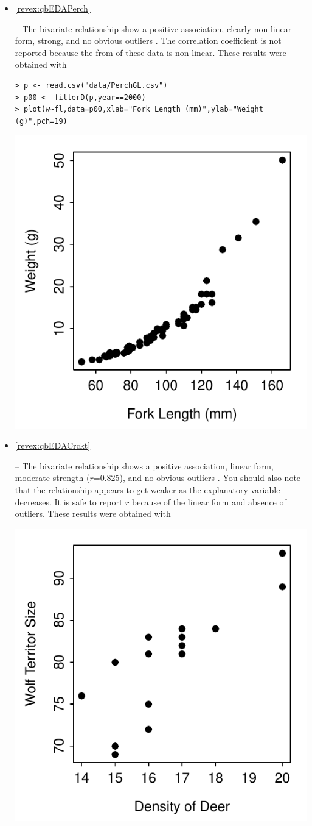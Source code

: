 \documentclass[10pt,openany]{book}\usepackage[]{graphicx}\usepackage[]{color}
\makeatletter
\newenvironment{kframe}{%
 \def\at@end@of@kframe{}%
 \ifinner\ifhmode%
  \def\at@end@of@kframe{\end{minipage}}%
  \begin{minipage}{\columnwidth}%
 \fi\fi%
 \def\FrameCommand##1{\hskip\@totalleftmargin \hskip-\fboxsep
 \colorbox{shadecolor}{##1}\hskip-\fboxsep
     \hskip-\linewidth \hskip-\@totalleftmargin \hskip\columnwidth}%
 \MakeFramed {\advance\hsize-\width
   \@totalleftmargin\z@ \linewidth\hsize
   \@setminipage}}%
 {\par\unskip\endMakeFramed%
 \at@end@of@kframe}
\newenvironment{knitrout}{}{} %
\makeatother
\begin{document}
\begin{itemize}
\begin{knitrout}
\end{knitrout}

  \item \hypertarget{ans:qbEDAPerch}{\ref{revex:qbEDAPerch}} -- The bivariate relationship show a positive association, clearly non-linear form, strong, and no obvious outliers .  The correlation coefficient is not reported because the from of these data is non-linear.  These results were obtained with
\begin{knitrout}
\color{fgcolor}\begin{kframe}
\begin{verbatim}
> p <- read.csv("data/PerchGL.csv")
> p00 <- filterD(p,year==2000)
> plot(w~fl,data=p00,xlab="Fork Length (mm)",ylab="Weight (g)",pch=19)
\end{verbatim}
\end{kframe}

{\centering \includegraphics[width=.4\linewidth]{Figs/PerchGLPlot-1} 

}



\end{knitrout}


  \item \hypertarget{ans:qbEDACrckt}{\ref{revex:qbEDACrckt}} -- The bivariate relationship shows a positive association, linear form, moderate strength ($r$=0.825), and no obvious outliers .  You should also note that the relationship appears to get weaker as the explanatory variable decreases.  It is safe to report $r$ because of the linear form and absence of outliers.  These results were obtained with
\begin{knitrout}
\color{fgcolor}

{\centering \includegraphics[width=.4\linewidth]{Figs/ChirpsPlot-1} 

}
\end{knitrout}
\end{itemize}
\end{document}
